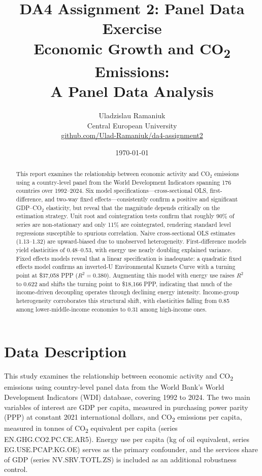 \documentclass[12pt, a4paper]{article}
\title{
    \large\textbf{DA4 Assignment 2: Panel Data Exercise}\\[0.5em]
    \LARGE\textbf{Economic Growth and CO\textsubscript{2} Emissions:\\
    A Panel Data Analysis}
}
\author{
    Uladzislau Ramaniuk\\
    \small Central European University\\
    \small \href{https://github.com/Ulad-Ramaniuk/da4-assignment2}{github.com/Ulad-Ramaniuk/da4-assignment2}
}
\date{\today}
\begin{document}
\maketitle
\thispagestyle{empty}

\begin{abstract}
\noindent
This report examines the relationship between economic activity and CO$_2$ emissions using a country-level panel from the World Development Indicators spanning 176 countries over 1992--2024. Six model specifications---cross-sectional OLS, first-difference, and two-way fixed effects---consistently confirm a positive and significant GDP--CO$_2$ elasticity, but reveal that the magnitude depends critically on the estimation strategy. Unit root and cointegration tests confirm that roughly 90\% of series are non-stationary and only 11\% are cointegrated, rendering standard level regressions susceptible to spurious correlation. Naive cross-sectional OLS estimates (1.13--1.32) are upward-biased due to unobserved heterogeneity. First-difference models yield elasticities of 0.48--0.53, with energy use nearly doubling explained variance. Fixed effects models reveal that a linear specification is inadequate: a quadratic fixed effects model confirms an inverted-U Environmental Kuznets Curve with a turning point at \$37,058 PPP ($R^2 = 0.380$). Augmenting this model with energy use raises $R^2$ to 0.622 and shifts the turning point to \$18,166 PPP, indicating that much of the income-driven decoupling operates through declining energy intensity. Income-group heterogeneity corroborates this structural shift, with elasticities falling from 0.85 among lower-middle-income economies to 0.31 among high-income ones.
\end{abstract}

\newpage

\section{Data Description}

This study examines the relationship between economic activity and CO\textsubscript{2} emissions using country-level panel data from the World Bank's World Development Indicators (WDI) database, covering 1992 to 2024. The two main variables of interest are GDP per capita, measured in purchasing power parity (PPP) at constant 2021 international dollars, and CO\textsubscript{2} emissions per capita, measured in tonnes of CO\textsubscript{2} equivalent per capita (series EN.GHG.CO2.PC.CE.AR5). Energy use per capita (kg of oil equivalent, series EG.USE.PCAP.KG.OE) serves as the primary confounder, and the services share of GDP (series NV.SRV.TOTL.ZS) is included as an additional robustness control.
\end{document}

